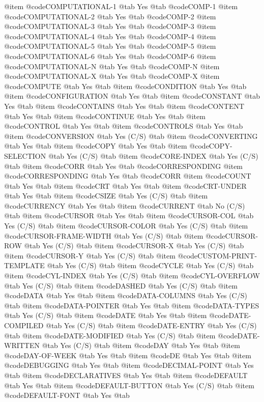 @item @code{COMPUTATIONAL-1} @tab Yes @tab @code{COMP-1}
@item @code{COMPUTATIONAL-2} @tab Yes @tab @code{COMP-2}
@item @code{COMPUTATIONAL-3} @tab Yes @tab @code{COMP-3}
@item @code{COMPUTATIONAL-4} @tab Yes @tab @code{COMP-4}
@item @code{COMPUTATIONAL-5} @tab Yes @tab @code{COMP-5}
@item @code{COMPUTATIONAL-6} @tab Yes @tab @code{COMP-6}
@item @code{COMPUTATIONAL-N} @tab Yes @tab @code{COMP-N}
@item @code{COMPUTATIONAL-X} @tab Yes @tab @code{COMP-X}
@item @code{COMPUTE} @tab Yes @tab 
@item @code{CONDITION} @tab Yes @tab 
@item @code{CONFIGURATION} @tab Yes @tab 
@item @code{CONSTANT} @tab Yes @tab 
@item @code{CONTAINS} @tab Yes @tab 
@item @code{CONTENT} @tab Yes @tab 
@item @code{CONTINUE} @tab Yes @tab 
@item @code{CONTROL} @tab Yes @tab 
@item @code{CONTROLS} @tab Yes @tab 
@item @code{CONVERSION} @tab Yes	(C/S) @tab 
@item @code{CONVERTING} @tab Yes @tab 
@item @code{COPY} @tab Yes @tab 
@item @code{COPY-SELECTION} @tab Yes	(C/S) @tab 
@item @code{CORE-INDEX} @tab Yes	(C/S) @tab 
@item @code{CORR} @tab Yes @tab @code{CORRESPONDING}
@item @code{CORRESPONDING} @tab Yes @tab @code{CORR}
@item @code{COUNT} @tab Yes @tab 
@item @code{CRT} @tab Yes @tab 
@item @code{CRT-UNDER} @tab Yes @tab 
@item @code{CSIZE} @tab Yes	(C/S) @tab 
@item @code{CURRENCY} @tab Yes @tab 
@item @code{CURRENT} @tab No	(C/S) @tab 
@item @code{CURSOR} @tab Yes @tab 
@item @code{CURSOR-COL} @tab Yes	(C/S) @tab 
@item @code{CURSOR-COLOR} @tab Yes	(C/S) @tab 
@item @code{CURSOR-FRAME-WIDTH} @tab Yes	(C/S) @tab 
@item @code{CURSOR-ROW} @tab Yes	(C/S) @tab 
@item @code{CURSOR-X} @tab Yes	(C/S) @tab 
@item @code{CURSOR-Y} @tab Yes	(C/S) @tab 
@item @code{CUSTOM-PRINT-TEMPLATE} @tab Yes	(C/S) @tab 
@item @code{CYCLE} @tab Yes	(C/S) @tab 
@item @code{CYL-INDEX} @tab Yes	(C/S) @tab 
@item @code{CYL-OVERFLOW} @tab Yes	(C/S) @tab 
@item @code{DASHED} @tab Yes	(C/S) @tab 
@item @code{DATA} @tab Yes @tab 
@item @code{DATA-COLUMNS} @tab Yes	(C/S) @tab 
@item @code{DATA-POINTER} @tab Yes @tab 
@item @code{DATA-TYPES} @tab Yes	(C/S) @tab 
@item @code{DATE} @tab Yes @tab 
@item @code{DATE-COMPILED} @tab Yes	(C/S) @tab 
@item @code{DATE-ENTRY} @tab Yes	(C/S) @tab 
@item @code{DATE-MODIFIED} @tab Yes	(C/S) @tab 
@item @code{DATE-WRITTEN} @tab Yes	(C/S) @tab 
@item @code{DAY} @tab Yes @tab 
@item @code{DAY-OF-WEEK} @tab Yes @tab 
@item @code{DE} @tab Yes @tab 
@item @code{DEBUGGING} @tab Yes @tab 
@item @code{DECIMAL-POINT} @tab Yes @tab 
@item @code{DECLARATIVES} @tab Yes @tab 
@item @code{DEFAULT} @tab Yes @tab 
@item @code{DEFAULT-BUTTON} @tab Yes	(C/S) @tab 
@item @code{DEFAULT-FONT} @tab Yes @tab 
